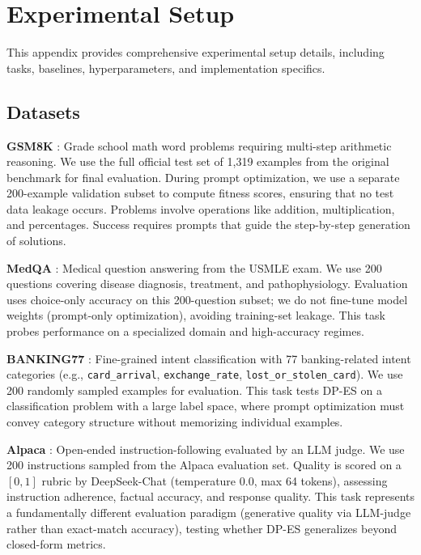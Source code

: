 \section{Experimental Setup}
\label{sec:appendix:exp}

\noindent This appendix provides comprehensive experimental setup details, including tasks, baselines, hyperparameters, and implementation specifics.

\subsection{Datasets}

\noindent \textbf{GSM8K} \cite{cobbe2021training}: Grade school math word problems requiring multi-step arithmetic reasoning. We use the full official test set of 1,319 examples from the original benchmark for final evaluation. During prompt optimization, we use a separate 200-example validation subset to compute fitness scores, ensuring that no test data leakage occurs. Problems involve operations like addition, multiplication, and percentages. Success requires prompts that guide the step-by-step generation of solutions.

\noindent \textbf{MedQA} \cite{jin2021disease}: Medical question answering from the USMLE exam. We use 200 questions covering disease diagnosis, treatment, and pathophysiology. Evaluation uses choice-only accuracy on this 200-question subset; we do not fine-tune model weights (prompt-only optimization), avoiding training-set leakage. This task probes performance on a specialized domain and high-accuracy regimes.

\noindent \textbf{BANKING77} \cite{casanueva2020efficient}: Fine-grained intent classification with 77 banking-related intent categories (e.g., \texttt{card\_arrival}, \texttt{exchange\_rate}, \texttt{lost\_or\_stolen\_card}). We use 200 randomly sampled examples for evaluation. This task tests DP-ES on a classification problem with a large label space, where prompt optimization must convey category structure without memorizing individual examples.

\noindent \textbf{Alpaca} \cite{taori2023alpaca}: Open-ended instruction-following evaluated by an LLM judge. We use 200 instructions sampled from the Alpaca evaluation set. Quality is scored on a $[0,1]$ rubric by DeepSeek-Chat (temperature 0.0, max 64 tokens), assessing instruction adherence, factual accuracy, and response quality. This task represents a fundamentally different evaluation paradigm (generative quality via LLM-judge rather than exact-match accuracy), testing whether DP-ES generalizes beyond closed-form metrics.

